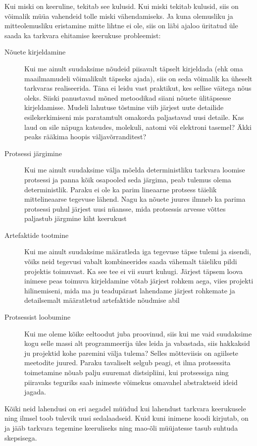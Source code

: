 \documentclass{tufte-book}
\begin{document}
Kui miski on keeruline, tekitab see kulusid. Kui miski tekitab kulusid, siis on võimalik müüa vahendeid tolle miski vähendamiseks. Ja kuna olemusliku ja mitteolemusliku eristamine mitte lihtne ei ole, siis on läbi ajaloo üritatud üle saada ka tarkvara ehitamise keerukuse probleemist:

\begin{description}
	\item[Nõuete kirjeldamine] Kui me ainult suudaksime nõudeid piisavalt täpselt kirjeldada (ehk oma maailmamudeli võimalikult täpseks ajada), siis on seda võimalik ka üheselt tarkvaras realiseerida. Täna ei leidu vast praktikut, kes sellise väitega nõus oleks. Siiski panustavad mõned metoodikad siiani nõuete ülitäpsesse kirjeldamisse. Mudeli lahutuse tõstmine viib järjest uute detailide esilekerkimiseni mis paratamtult omakorda paljastavad uusi detaile. Kas laud on sile näpuga katsudes, molekuli, aatomi või elektroni tasemel? Äkki peaks rääkima hoopis väljavõrranditest?
	\item[Protsessi järgimine] Kui me ainult suudaksime välja mõelda deterministliku tarkvara loomise protsessi ja panna kõik osapooled seda järgima, peab tulemus olema deterministlik. Paraku ei ole ka parim lineaarne protsess täielik mittelineaarse tegevuse lähend. Nagu ka nõuete juures ilmneb ka parima protsessi puhul järjest uusi nüansse, mida protsessis arvesse võttes paljastub järgmine kiht keerukust
	\item[Artefaktide tootmine] Kui me ainult suudaksime määratleda iga tegevuse täpse tulemi ja sisendi, võiks neid tegevusi vabalt kombineerides saada vähemalt täieliku pildi projektis toimuvast. Ka see tee ei vii suurt kuhugi. Järjest täpsem loova inimese peas toimuva kirjeldamine võtab järjest rohkem aega, viies projekti hilinemiseni, mida ma ju teadupärast lahendame järjest rohkemate ja detailsemalt määratletud artefaktide nõudmise abil
	\item[Protsessist loobumine] Kui me oleme kõike eeltoodut juba proovinud, siis kui me vaid suudaksime kogu selle massi alt programmeerija üles leida ja vabastada, siis hakkaksid ju projektid kohe paremini välja tulema? Selles mõtteviisis on agiilsete meetodite juured. Paraku tavaliselt selgub peagi, et ilma protsessita toimetamine nõuab palju suuremat distsipliini, kui protsessiga ning piiravaks teguriks saab inimeste võimekus omavahel abstraktseid ideid jagada. 
\end{description}

Kõiki neid lahendusi on eri aegadel müüdud kui lahendust tarkvara keerukusele ning ilmsel toob tulevik uusi sedalaadseid. Kuid kuni inimene koodi kirjutab, on ja jääb tarkvara tegemine keeruliseks ning mao-õli müüjatesse tasub suhtuda skepsisega.
\end{document}
